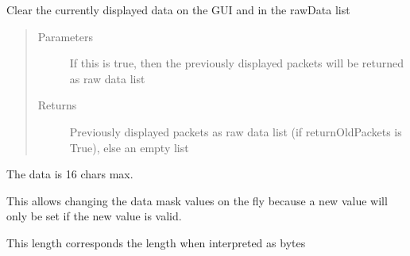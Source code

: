 \documentclass[letterpaper,10pt,english]{sphinxmanual}
\begin{document}
\begin{fulllineitems}
\begin{fulllineitems}
\end{fulllineitems}


\begin{fulllineitems}
\label{\detokenize{src:src.FuzzerTab.FuzzerTab.clear}}
Clear the currently displayed data on the GUI and in the rawData list
\begin{quote}\begin{description}
\item[{Parameters}] \leavevmode
{} \textendash{} If this is true, then the previously displayed packets will
be returned as raw data list

\item[{Returns}] \leavevmode
Previously displayed packets as raw data list (if returnOldPackets is True), else an empty list

\end{description}\end{quote}

\end{fulllineitems}


\begin{fulllineitems}
\label{\detokenize{src:src.FuzzerTab.FuzzerTab.dataMask}}
The data is 16 chars max.

\end{fulllineitems}


\begin{fulllineitems}
\label{\detokenize{src:src.FuzzerTab.FuzzerTab.dataMaskChanged}}
This allows changing the data mask values on the fly because a new value
will only be set if the new value is valid.

\end{fulllineitems}


\begin{fulllineitems}
\label{\detokenize{src:src.FuzzerTab.FuzzerTab.dataMaxLength}}
This length corresponds the length when interpreted as bytes


\end{fulllineitems}
\end{fulllineitems}
\end{document}
